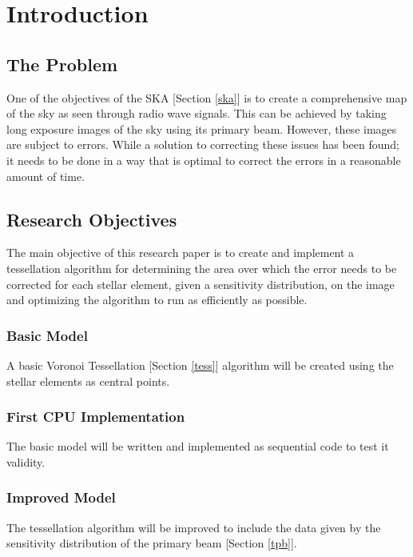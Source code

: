 \chapter{Introduction}
\section{The Problem}
One of the objectives of the SKA [Section \ref{ska}] is to create a comprehensive map of the sky as seen through radio wave signals. This can be achieved by taking long exposure images of the sky using its primary beam. However, these images are subject to errors. While a solution to correcting these issues has been found; it needs to be done in a way that is optimal to correct the errors in a reasonable amount of time.
\section{Research Objectives}
The main objective of this research paper is to create and implement a tessellation algorithm for determining the area over which the error needs to be corrected for each stellar element, given a sensitivity distribution, on the image and optimizing the algorithm to run as efficiently as possible.
\subsection{Basic Model}
A basic Voronoi Tessellation [Section \ref{tess}] algorithm will be created using the stellar elements as central points.
\subsection{First CPU Implementation}
The basic model will be written and implemented as sequential code to test it validity.
\subsection{Improved Model}
The tessellation algorithm will be improved to include the data given by the sensitivity distribution of the primary beam [Section \ref{tpb}].
